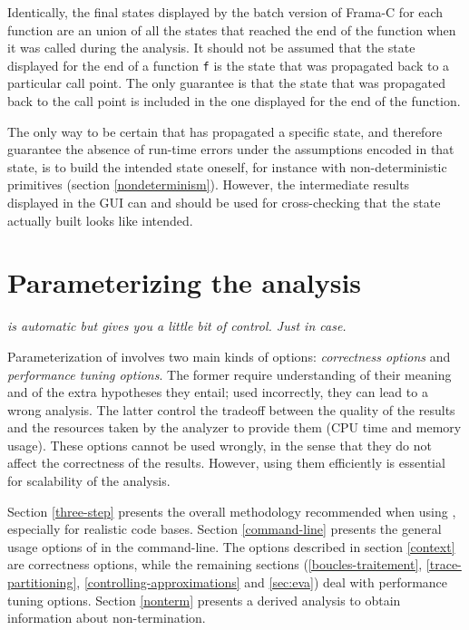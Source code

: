 \documentclass{frama-c-book}
\begin{document}
Identically, the final states displayed by the batch version of
Frama-C for each function are an union of all
the states that reached the end of the function when it was called
during the analysis.  It should not be assumed that the state
displayed for the end of a function \verb|f| is the state that was
propagated back to a particular call point. The only guarantee is
that the state that was propagated back to the call point is included
in the one displayed for the end of the function.

The only way to be certain that \Eva{} has propagated
a specific state, and therefore guarantee the absence of run-time
errors under the assumptions encoded in that state, is to build
the intended state oneself, for instance with non-deterministic
primitives (section \ref{nondeterminism}).
However, the intermediate results displayed in
the GUI can and should be used for
cross-checking that the state actually built
looks like intended.


\chapter{Parameterizing the analysis}\label{parameterizing}
\vspace{2cm}

{\em \Eva{} is automatic but gives you a little bit of control.
Just in case.}

\vspace{2cm}

Parameterization of \Eva{} involves two main kinds of options:
{\em correctness options} and {\em performance tuning options}.
The former require understanding of their meaning and of the extra hypotheses
they entail; used incorrectly, they can lead to a wrong analysis.
The latter control the tradeoff between the quality of the results and the
resources taken by the analyzer to provide them (CPU time and memory usage).
These options cannot be used wrongly, in the sense that they do not affect the
correctness of the results. However, using them efficiently is essential for
scalability of the analysis.

Section \ref{three-step} presents the overall methodology recommended when
using \Eva{}, especially for realistic code bases.
Section \ref{command-line} presents the general usage options of \Eva{} in the
command-line.
The options described in section \ref{context} are correctness options,
while the remaining sections (\ref{boucles-traitement},
\ref{trace-partitioning},
\ref{controlling-approximations} and \ref{sec:eva}) deal with performance
tuning options. Section \ref{nonterm} presents a derived analysis to
obtain information about non-termination.
\end{document}
